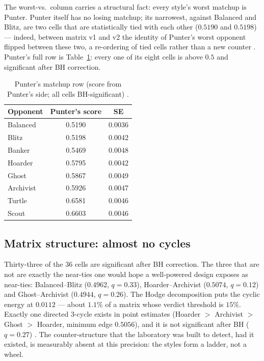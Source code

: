 \documentclass[11pt]{article}
\begin{document}
The worst-vs.\ column carries a structural fact: every style's worst matchup is Punter. Punter
itself has no losing matchup; its narrowest, against Balanced and Blitz, are two cells that
are statistically tied with each other ($0.5190$ and $0.5198$) --- indeed, between matrix v1
and v2 the identity of Punter's worst opponent flipped between these two, a re-ordering of
tied cells rather than a new counter \cite{styles}. Punter's full row is
Table~\ref{tab:punterrow}: every one of its eight cells is above $0.5$ and significant after
BH correction.

\begin{table}[t]
\centering
\caption{Punter's matchup row (score from Punter's side; all cells BH-significant)
\cite{artifact}.}
\label{tab:punterrow}
\footnotesize
\begin{tabular}{@{}lcc@{}}
\toprule
Opponent & Punter's score & SE \\
\midrule
Balanced  & 0.5190 & 0.0036 \\
Blitz     & 0.5198 & 0.0042 \\
Banker    & 0.5469 & 0.0048 \\
Hoarder   & 0.5795 & 0.0042 \\
Ghost     & 0.5867 & 0.0049 \\
Archivist & 0.5926 & 0.0047 \\
Turtle    & 0.6581 & 0.0046 \\
Scout     & 0.6603 & 0.0046 \\
\bottomrule
\end{tabular}
\end{table}

\subsection{Matrix structure: almost no cycles}

Thirty-three of the 36 cells are significant after BH correction. The three that are not are
exactly the near-ties one would hope a well-powered design exposes as near-ties:
Balanced--Blitz ($0.4962$, $q = 0.33$), Hoarder--Archivist ($0.5074$, $q = 0.12$) and
Ghost--Archivist ($0.4944$, $q = 0.26$). The Hodge decomposition puts the cyclic energy at
$0.0112$ --- about $1.1\%$ of a matrix whose verdict threshold is $15\%$. Exactly one directed
3-cycle exists in point estimates (Hoarder $>$ Archivist $>$ Ghost $>$ Hoarder, minimum edge
$0.5056$), and it is not significant after BH ($q = 0.27$) \cite{styles,artifact}. The
counter-structure that the laboratory was built to detect, had it existed, is measurably
absent at this precision: the styles form a ladder, not a wheel.
\end{document}
